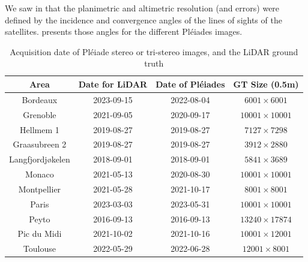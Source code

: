 We saw in  that the planimetric and altimetric resolution (and errors) were defined by the incidence and convergence angles of the lines of sights of the satellites.  presents those angles for the different Pléiades images.

\begin{table}[ht]
    \centering
    \begin{tabular}{|c||c|c|c|}
    \hline
        Area & Date for LiDAR & Date of Pléiades &  GT Size (0.5m)\\
        \hline\hline
        Bordeaux & 2023-09-15 & 2022-08-04 & $6001\times 6001$\\\hline
        Grenoble & 2021-09-05 & 2020-09-17 & $10 001\times 10 001$ \\\hline
        Hellmem 1 & 2019-08-27 & 2019-08-27 & $7127\times 7298$ \\\hline
        Graasubreen 2 & 2019-08-27 & 2019-08-27 & $3912\times2880$ \\\hline
        Langfjordjøkelen & 2018-09-01 & 2018-09-01 & $5841\times 3689$\\\hline
        Monaco & 2021-05-13 & 2020-08-30 & $10 001\times 10 001$\\\hline
        Montpellier & 2021-05-28 & 2021-10-17 & $8001\times 8001$\\\hline
        Paris & 2023-03-03 & 2023-05-31 & $10 001\times 10 001$\\\hline
        Peyto & 2016-09-13 & 2016-09-13 & $13240\times 17874$\\\hline
        Pic du Midi & 2021-10-02 & 2021-10-16 & $10001 \times 12001$ \\\hline
        Toulouse & 2022-05-29 & 2022-06-28 & $12001\times 8001$\\\hline
    \end{tabular}
    \caption{Acquisition date of Pléiade stereo or tri-stereo images, and the LiDAR ground truth}
    \label{tab:dates_pleiades_lidar_hd}
\end{table}

